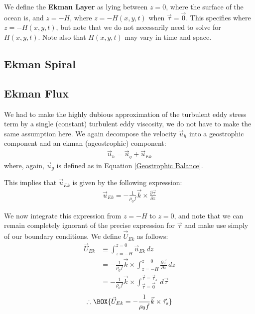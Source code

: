We define the \textbf{Ekman Layer} as lying between \(z=0\), where the surface of the ocean is, and \(z=-H\), where \(z=-H(x,y,t)\) when \(\vec{\tau}=\vec{0}\). This specifies where \(z=-H(x,y,t)\), but note that we do not necessarily need to solve for \(H(x,y,t)\). Note also that \(H(x,y,t)\) may vary in time and space.

\subsection{Ekman Spiral}



\subsection{Ekman Flux}

We had to make the highly dubious approximation of the turbulent eddy stress term by a single (constant) turbulent eddy viscosity, we do not have to make the same assumption here. We again decompose the velocity \(\vec{u}_h\) into a geostrophic component and an ekman (ageostrophic) component:
\begin{align*}
    \vec{u}_h = \vec{u}_g + \vec{u}_{Ek}
\end{align*}
where, again, \(\vec{u}_g\) is defined as in Equation \ref{Geostrophic Balance}.

This implies that \(\vec{u}_{Ek}\) is given by the following expression:
\begin{align*}
    \vec{u}_{Ek} = - \frac{1}{\rho_0 f}\vec{k}\times\frac{\partial \vec{\tau}}{\partial z}
\end{align*}

We now integrate this expression from \(z=-H\) to \(z=0\), and note that we can remain completely ignorant of the precise expression for \(\vec{\tau}\) and make use simply of our boundary conditions. We define \(\vec{U}_{Ek}\) as follows:
\begin{align*}
    \vec{U}_{Ek}&\equiv
    \int_{z=-H}^{z=0}\vec{u}_{Ek}\, dz
    \\
    &=
    -\frac{1}{\rho_0 f}\vec{k}\times\int_{z=-H}^{z=0}\frac{\partial \vec{\tau}}{\partial z}\, dz
    \\
    &=
    -\frac{1}{\rho_0 f}\vec{k}\times\int_{\vec{\tau}=\vec{0}}^{\vec{\tau}=\vec{\tau}_s}\,d\vec{\tau}
\end{align*}
\begin{gather}
    \therefore\BOX{
        \vec{U}_{Ek}=-\frac{1}{\rho_0 f}\vec{k}\times\vec{\tau}_s
    }
\end{gather}

